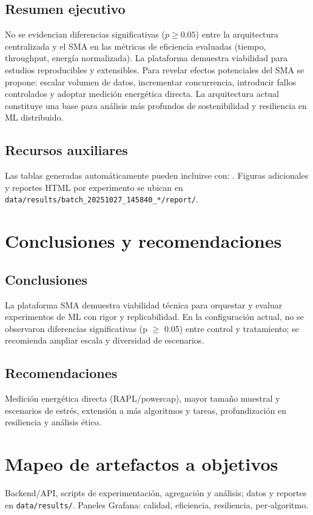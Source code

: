 \documentclass[12pt,oneside]{report}
\begin{document}
    \section{Resumen ejecutivo}
    No se evidencian diferencias significativas (\(p \ge 0.05\)) entre la arquitectura centralizada y el SMA en las métricas de eficiencia evaluadas (tiempo, throughput, energía normalizada). La plataforma demuestra viabilidad para estudios reproducibles y extensibles. Para revelar efectos potenciales del SMA se propone: escalar volumen de datos, incrementar concurrencia, introducir fallos controlados y adoptar medición energética directa. La arquitectura actual constituye una base para análisis más profundos de sostenibilidad y resiliencia en ML distribuido.

    \section{Recursos auxiliares}
    Las tablas generadas automáticamente pueden incluirse con: \verb||. Figuras adicionales y reportes HTML por experimento se ubican en \texttt{data/results/batch\_20251027\_145840\_*/report/}.

\chapter{Conclusiones y recomendaciones}
\section{Conclusiones}
La plataforma SMA demuestra viabilidad técnica para orquestar y evaluar experimentos de ML con rigor y replicabilidad. En la configuración actual, no se observaron diferencias significativas (p $\ge$ 0.05) entre control y tratamiento; se recomienda ampliar escala y diversidad de escenarios.

\section{Recomendaciones}
Medición energética directa (RAPL/powercap), mayor tamaño muestral y escenarios de estrés, extensión a más algoritmos y tareas, profundización en resiliencia y análisis ético.

\appendix
\chapter{Mapeo de artefactos a objetivos}
Backend/API, scripts de experimentación, agregación y análisis; datos y reportes en \texttt{data/results/}. Paneles Grafana: calidad, eficiencia, resiliencia, per‑algoritmo.
\end{document}
